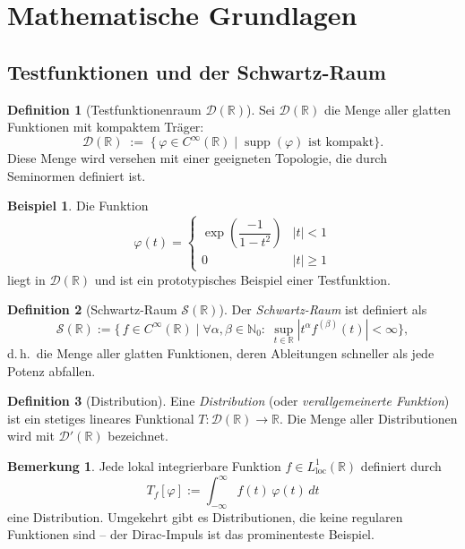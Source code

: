 ﻿\documentclass[a4paper,12pt]{article}
\theoremstyle{definition}
\newtheorem{definition}{Definition}
\newtheorem{beispiel}{Beispiel}
\newtheorem{bemerkung}{Bemerkung}
\begin{document}
\section{Mathematische Grundlagen}
\label{sec:grundlagen}

\subsection{Testfunktionen und der Schwartz-Raum}

\begin{definition}[Testfunktionenraum $\mathcal{D}(\mathbb{R})$]
\label{def:testfunktionen}
Sei $\mathcal{D}(\mathbb{R})$ die Menge aller glatten Funktionen mit kompaktem Tr\"ager:
\[
\mathcal{D}(\mathbb{R}) \;:=\;
\bigl\{\,\varphi \in C^\infty(\mathbb{R}) \;\big|\;
\operatorname{supp}(\varphi) \text{ ist kompakt}\bigr\}.
\]
Diese Menge wird versehen mit einer geeigneten Topologie, die durch Seminormen definiert ist.
\end{definition}

\begin{beispiel}
Die Funktion
\[
\varphi(t) = \begin{cases}
\exp\!\left(\dfrac{-1}{1-t^2}\right) & |t| < 1 \\
0 & |t| \geq 1
\end{cases}
\]
liegt in $\mathcal{D}(\mathbb{R})$ und ist ein prototypisches Beispiel einer Testfunktion.
\end{beispiel}

\begin{definition}[Schwartz-Raum $\mathcal{S}(\mathbb{R})$]
Der \emph{Schwartz-Raum} ist definiert als
\[
\mathcal{S}(\mathbb{R}) := \bigl\{\, f \in C^\infty(\mathbb{R}) \;\big|\;
\forall \alpha, \beta \in \mathbb{N}_0:\; \sup_{t \in \mathbb{R}} |t^\alpha f^{(\beta)}(t)| < \infty \bigr\},
\]
d.\,h.\ die Menge aller glatten Funktionen, deren Ableitungen schneller als jede Potenz abfallen.
\end{definition}

\begin{definition}[Distribution]
\label{def:distribution}
Eine \emph{Distribution} (oder \emph{verallgemeinerte Funktion}) ist ein stetiges lineares Funktional
$T: \mathcal{D}(\mathbb{R}) \to \mathbb{R}$. Die Menge aller Distributionen wird mit
$\mathcal{D}'(\mathbb{R})$ bezeichnet.
\end{definition}

\begin{bemerkung}
Jede lokal integrierbare Funktion $f \in L^1_{\mathrm{loc}}(\mathbb{R})$ definiert durch
\[
T_f[\varphi] := \int_{-\infty}^{\infty} f(t)\,\varphi(t)\,dt
\]
eine Distribution. Umgekehrt gibt es Distributionen, die keine regularen Funktionen sind --
der Dirac-Impuls ist das prominenteste Beispiel.
\end{bemerkung}
\end{document}
